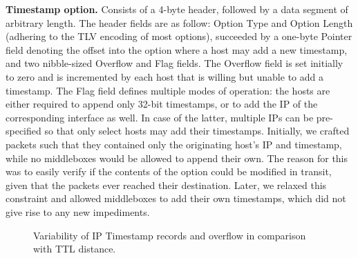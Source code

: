 \textbf{Timestamp option.} Consists of a 4-byte header, followed by a data segment of arbitrary length. The header fields are as follow: Option Type and Option Length (adhering to the TLV encoding of most options), succeeded by a one-byte Pointer field denoting the offset into the option where a host may add a new timestamp, and two nibble-sized Overflow and Flag fields. The Overflow field is set initially to zero and is incremented by each host that is willing but unable to add a timestamp. The Flag field defines multiple modes of operation: the hosts are either required to append only 32-bit timestamps, or to add the IP of the corresponding interface as well. In case of the latter, multiple IPs can be pre-specified so that only select hosts may add their timestamps. Initially, we crafted packets such that they contained only the originating host's IP and timestamp, while no middleboxes would be allowed to append their own. The reason for this was to easily verify if the contents of the option could be modified in transit, given that the packets ever reached their destination. Later, we relaxed this constraint and allowed middleboxes to add their own timestamps, which did not give rise to any new impediments.

\begin{figure}[htb]
    \centering
    
    \caption{Variability of IP Timestamp records and overflow in comparison with TTL distance.}
    \label{extend:ops:fig:ttl-ovf}
\end{figure}

